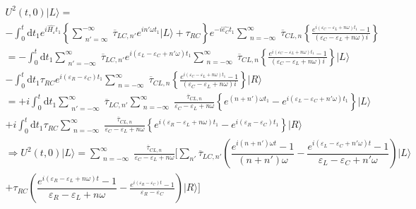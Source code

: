 \begin{multline} \label{eq:22}
U^{2}(t,0) \vert L \rangle = 
\\
-\int_{0}^{t} \mathrm{d}t_1  e^{i\widehat{H_{\varepsilon}}t_1} \left\lbrace \sum_{\substack{n'=\infty}}^{-\infty} \overline{\tau}_{LC,n'} e^{i n' \omega t_1}  \vert L \rangle + \tau_{RC} \right\rbrace  e^{-i\widehat{e_{C}}t_1} \sum_{\substack{n={-\infty}}}^{\infty} \overline{\tau}_{CL,n} \left\lbrace \frac{e^{i(\varepsilon_C -\varepsilon_L + n \omega )t_1} -1}{ (\varepsilon_C -\varepsilon_L + n \omega )i} \right\rbrace 
\\
=-\int_{0}^{t} \mathrm{d}t_1 \sum_{\substack{n'={-\infty}}}^{\infty} \overline{\tau}_{LC,n'} e^{i(\varepsilon_L-\varepsilon_C+ n' \omega) t_1}   \sum_{\substack{n=-\infty}}^{\infty} \overline{\tau}_{CL,n} \left\lbrace \frac{e^{i(\varepsilon_C -\varepsilon_L + n \omega )t_1} -1}{ (\varepsilon_C -\varepsilon_L + n \omega )i} \right\rbrace  \vert L \rangle
\\
-\int_{0}^{t} \mathrm{d}t_1 \tau_{RC} e^{i(\varepsilon_R-{\varepsilon}_C) t_1} \sum_{\substack{n=-\infty}}^{\infty} \overline{\tau}_{CL,n} \left\lbrace \frac{e^{i(\varepsilon_C -\varepsilon_L + n \omega )t_1} -1}{ (\varepsilon_C -\varepsilon_L + n \omega )i} \right\rbrace \vert R \rangle
\\
=+i\int_{0}^{t} \mathrm{d}t_1 \sum_{\substack{n'=-\infty}}^{\infty} {\overline{\tau}_{LC,n'}} \sum_{\substack{n=-\infty}}^{\infty}   \frac {\overline{\tau}_{CL,n}} { \varepsilon_C -\varepsilon_L + n \omega } \left\lbrace e^{(n+n')\omega t_1} - e^{i(\varepsilon_L-\varepsilon_C+ n' \omega) t_1} \right\rbrace \vert L \rangle
\\ 
+i\int_{0}^{t} \mathrm{d}t_1 \tau_{RC} \sum_{\substack{n=-\infty}}^{\infty} \frac{\overline{\tau}_{CL,n} } { \varepsilon_C -\varepsilon_L + n \omega } \left\lbrace  e^{i(\varepsilon_{R}-\varepsilon_{L}+n \omega )t_1} - e^{i(\varepsilon_R-\varepsilon_C)t_1} \right\rbrace  \vert R \rangle
\\
\Rightarrow U^{2}(t,0) \vert L \rangle = \sum_{\substack{n=-\infty}}^{\infty} \frac{\overline{\tau}_{CL,n} } { \varepsilon_C -\varepsilon_L + n \omega } [ 
  \sum_{n'} \overline{\tau}_{LC,n'} \left(  \dfrac{ e^{ i (n+n')\omega t } -1}{ ( n+n' ) \omega } - \dfrac{ e^{i ( \varepsilon_L - \varepsilon_C + n'\omega ) t } - 1 } { \varepsilon_L - \varepsilon_C + n'  \omega  } \right)    \vert L \rangle 
\\
+\tau_{RC} \left(  \dfrac{ e^{i ( \varepsilon_R - \varepsilon_L + n \omega )  t } - 1 } { \varepsilon_R - \varepsilon_L + n \omega  } - \frac{ e^{i ( \varepsilon_R - \varepsilon_C )  t } - 1 } { \varepsilon_R - \varepsilon_C } \right)  \vert R \rangle ] 
\end{multline}

